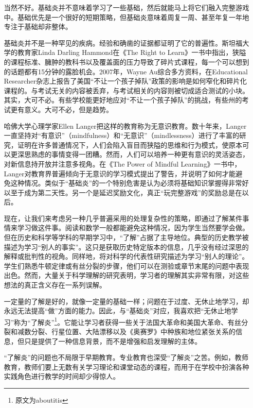 当然不好。基础炎并不意味着学习了一些基础，然后就能马上将它们融入完整游戏中。基础优先是一个很好的短期策略，但基础炎意味着周复一周、甚至年复一年地专注于基础却非整体。

基础炎并不是一种罕见的疾病。经验和确凿的证据都证明了它的普遍性。斯坦福大学的教育家Linda Darling Hammond在《The Right to Learn》一书中指出，狭隘的课程标准、臃肿的教科书以及覆盖面的压力导致了碎片式课程，每一个可以想到的话题都有15分钟的露脸机会。2007年，Wayne Au综合多方资料，在Educational Researcher杂志上报告了美国“不让一个孩子掉队”政策的影响是如何窄化和碎片化课程的。与考试无关的内容被丢弃，与考试相关的内容则被切成适合测试的小块。其实，大可不必。有些学校能更好地应对“不让一个孩子掉队”的挑战，有些州的考试更有意义。大可不必，但是趋势。

哈佛大学心理学家Ellen Langer把这样的教育称为无意识教育。数十年来，Langer一直坚持对“有意识”（mindfulness）和“无意识”（mindlessness）进行了丰富的研究，证明在许多普通情况下，人们会陷入盲目而狭隘的思维和行为模式，使原本可以更深思熟虑的事情变得一团糟。然而，人们可以培养一种更有意识的灵活姿态，对新信息持开放并注意多视角。在《The Power of Mindful Learning》一书中，Langer对教育界普遍倾向于无意识的学习模式提出了警告，并说明了如何才能避免这种情况。类似于“基础炎”的一个特别危害是认为必须将基础知识掌握得非常好以至于成为第二天性。另一个是延迟奖励文化，真正“玩完整游戏”的奖励总是在以后。

现在，让我们来考虑另一种几乎普遍采用的处理复杂性的策略，即通过了解某件事情来学习做这件事。阅读和数学一般都能避免这种情况，因为学生当然要学会做。但在历史和科学等学科的早期学习中，“了解”占据了主导地位。典型的历史教学被描述为学习“别人的事实”。这只是获取历史特定版本的信息，几乎没有经过深思的解释或批判性的视角。同样地，将对科学的代表性研究描述为学习“别人的理论”。学生们熟悉牛顿定律或有丝分裂的步骤，他们可以在测验或章节末尾的问题中表现出色。然而，大量关于科学理解的研究表明，学习者的理解其实非常有限，对这些想法的真正含义存在一系列误解。

一定量的了解是好的，就像一定量的基础一样；问题在于过度、无休止地学习，却永远无法提高“做”方面的能力。因此，与“基础炎”对应，我喜欢把“无休止地学习”称为“了解炎”\footnote{原文为aboutitis}。它能让学习者获得一些关于法国大革命和美国大革命、有丝分裂和减数分裂、行星位置、大陆漂移以及《奥赛罗》中种族和地位紧张关系的信息，但只是提供了一种信息背景，而不是增强和启发理解的主体。

“了解炎”的问题也不局限于早期教育。专业教育也深受“了解炎”之苦。例如，教师教育，教师们要上无数有关学习理论和课堂动态的课程，而用于在学校中扮演各种实践角色进行教学的时间却少得惊人。


